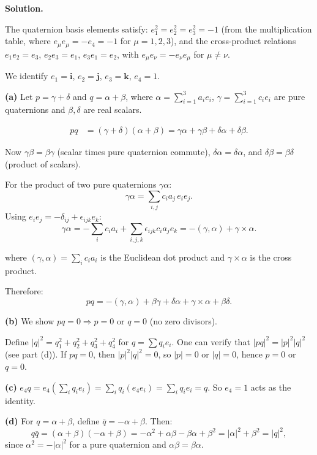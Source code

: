 \documentclass[12pt]{article}
\begin{document}
\bigskip
\textbf{Solution.}

The quaternion basis elements satisfy: $e_1^2 = e_2^2 = e_3^2 = -1$ (from the multiplication table, where $e_\mu e_\mu = -e_4 = -1$ for $\mu = 1,2,3$), and the cross-product relations $e_1 e_2 = e_3$, $e_2 e_3 = e_1$, $e_3 e_1 = e_2$, with $e_\mu e_\nu = -e_\nu e_\mu$ for $\mu \neq \nu$.

We identify $e_1 = \mathbf{i}$, $e_2 = \mathbf{j}$, $e_3 = \mathbf{k}$, $e_4 = 1$.

\textbf{(a)} Let $p = \gamma + \delta$ and $q = \alpha + \beta$, where $\alpha = \sum_{i=1}^3 a_i e_i$, $\gamma = \sum_{i=1}^3 c_i e_i$ are pure quaternions and $\beta, \delta$ are real scalars.

\begin{align*}
pq &= (\gamma + \delta)(\alpha + \beta) = \gamma\alpha + \gamma\beta + \delta\alpha + \delta\beta.
\end{align*}

Now $\gamma\beta = \beta\gamma$ (scalar times pure quaternion commute), $\delta\alpha = \delta\alpha$, and $\delta\beta = \beta\delta$ (product of scalars).

For the product of two pure quaternions $\gamma\alpha$:
\[
\gamma\alpha = \sum_{i,j} c_i a_j\, e_i e_j.
\]
Using $e_i e_j = -\delta_{ij} + \epsilon_{ijk}e_k$:
\[
\gamma\alpha = -\sum_i c_i a_i + \sum_{i,j,k}\epsilon_{ijk}c_i a_j e_k = -(\gamma, \alpha) + \gamma \times \alpha.
\]

where $(\gamma,\alpha) = \sum_i c_i a_i$ is the Euclidean dot product and $\gamma \times \alpha$ is the cross product.

Therefore:
\[
\boxed{pq = -(\gamma,\alpha) + \beta\gamma + \delta\alpha + \gamma\times\alpha + \beta\delta}.
\]

\textbf{(b)} We show $pq = 0 \Rightarrow p = 0$ or $q = 0$ (no zero divisors).

Define $|q|^2 = q_1^2 + q_2^2 + q_3^2 + q_4^2$ for $q = \sum q_i e_i$. One can verify that $|pq|^2 = |p|^2|q|^2$ (see part (d)). If $pq = 0$, then $|p|^2|q|^2 = 0$, so $|p| = 0$ or $|q| = 0$, hence $p = 0$ or $q = 0$.

\textbf{(c)} $e_4 q = e_4(\sum_i q_i e_i) = \sum_i q_i(e_4 e_i) = \sum_i q_i e_i = q$. So $e_4 = 1$ acts as the identity. \checkmark

\textbf{(d)} For $q = \alpha + \beta$, define $\bar{q} = -\alpha + \beta$. Then:
\[
q\bar{q} = (\alpha+\beta)(-\alpha+\beta) = -\alpha^2 + \alpha\beta - \beta\alpha + \beta^2 = |\alpha|^2 + \beta^2 = |q|^2,
\]
since $\alpha^2 = -|\alpha|^2$ for a pure quaternion and $\alpha\beta = \beta\alpha$.
\end{document}
